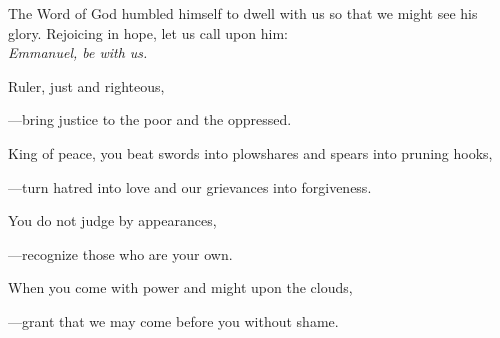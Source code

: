 \intercessions\indent

\begin{hangpar}

The Word of God humbled himself to dwell with us so that we might see his glory. Rejoicing in hope, let us call upon him:\\
\emph{Emmanuel, be with us.}

\medskip Ruler, just and righteous,

{\color{red}---\thinspace}bring justice to the poor and the oppressed.

\medskip King of peace, you beat swords into plowshares and spears into pruning hooks,

{\color{red}---\thinspace}turn hatred into love and our grievances into forgiveness.

\medskip You do not judge by appearances,

{\color{red}---\thinspace}recognize those who are your own.

\medskip When you come with power and might upon the clouds,

{\color{red}---\thinspace}grant that we may come before you without shame.

\end{hangpar}